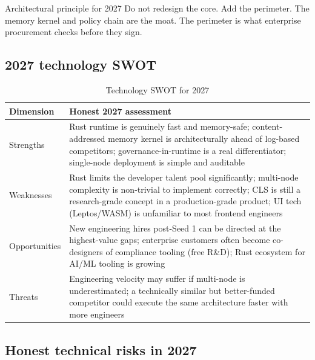 \begin{insightbox}{Architectural principle for 2027}
Do not redesign the core. Add the perimeter. The memory kernel and policy chain
are the moat. The perimeter is what enterprise procurement checks before they
sign.
\end{insightbox}

\subsection{2027 technology SWOT}

\begin{table}[H]
\centering
\renewcommand{\arraystretch}{1.45}
\begin{tabularx}{\textwidth}{@{}lX@{}}
\toprule
\textbf{Dimension} & \textbf{Honest 2027 assessment} \\
\midrule
Strengths & Rust runtime is genuinely fast and memory-safe; content-addressed memory kernel is architecturally ahead of log-based competitors; governance-in-runtime is a real differentiator; single-node deployment is simple and auditable \\
Weaknesses & Rust limits the developer talent pool significantly; multi-node complexity is non-trivial to implement correctly; CLS is still a research-grade concept in a production-grade product; UI tech (Leptos/WASM) is unfamiliar to most frontend engineers \\
Opportunities & New engineering hires post-Seed 1 can be directed at the highest-value gaps; enterprise customers often become co-designers of compliance tooling (free R\&D); Rust ecosystem for AI/ML tooling is growing \\
Threats & Engineering velocity may suffer if multi-node is underestimated; a technically similar but better-funded competitor could execute the same architecture faster with more engineers \\
\bottomrule
\end{tabularx}
\caption{Technology SWOT for 2027}
\end{table}

\subsection{Honest technical risks in 2027}

